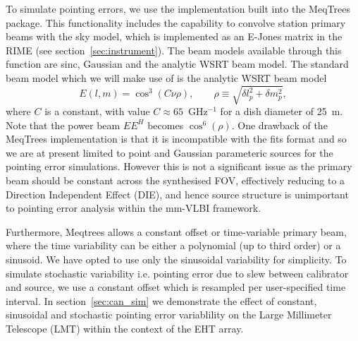 To simulate pointing errors, we use the implementation built into the {\sc MeqTrees} package. This functionality includes the capability to convolve station primary beams with the sky model, which is implemented as an E-Jones matrix in the RIME (see section~\ref{sec:instrument}). The beam models available through this function are sinc, Gaussian and the analytic WSRT beam model. The standard beam model which we will make use of is the analytic WSRT beam model \citep{Popping_2008} 
\begin{equation}\label{eq:wsrt_beam}
E(l, m) = \cos^3(C\nu \rho),\qquad   \rho \equiv \sqrt{\delta l_p^2 + \delta m_p^2},
\end{equation}
where $C$ is a constant, with value $C \approx 65$~GHz$^{-1}$ for a dish diameter of 25~m. Note that the power beam $EE^H$ becomes $\cos^6(\rho)$.  One drawback of the {\sc MeqTrees} implementation is that it is incompatible with the {\sc fits} format and so we are at present limited to point and Gaussian parameteric sources for the pointing error simulations. However this is not a significant issue as the primary beam should be constant across the synthesised FOV, effectively reducing to a Direction Independent Effect (DIE), and hence source structure is unimportant to pointing error analysis within the mm-VLBI framework.


Furthermore, {\sc Meqtrees} allows a constant offset or time-variable primary beam, where the time variability can be either a polynomial (up to third order) or a sinusoid. We have opted to use only the sinusoidal variability for simplicity. To simulate stochastic variability i.e. pointing error due to slew between calibrator and source, we use a constant offset which is resampled per user-specified time interval. In section~\ref{sec:can_sim} we demonstrate the effect of constant, sinusoidal and stochastic pointing error variablility on the Large Millimeter Telescope (LMT) within the context of the EHT array.

